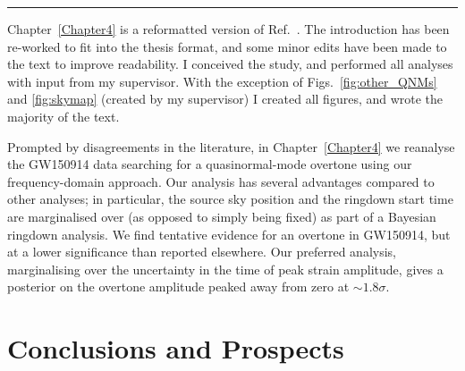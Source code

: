 \documentclass[
12pt, %
english, %
doublespacing, %
headsepline, %
]{MastersDoctoralThesis} %
\begin{document}
\begin{center}
    \rule[.5ex]{.5\textwidth}{.5pt}
\end{center}

\noindent Chapter~\ref{Chapter4} is a reformatted version of Ref.~\cite{Finch:2022ynt}. 
The introduction has been re-worked to fit into the thesis format, and some minor edits have been made to the text to improve readability. 
I conceived the study, and performed all analyses with input from my supervisor.
With the exception of Figs.~\ref{fig:other_QNMs} and \ref{fig:skymap} (created by my supervisor) I created all figures, and wrote the majority of the text.

\vspace{0.2cm}

\noindent Prompted by disagreements in the literature, in Chapter~\ref{Chapter4} we reanalyse the GW150914 data searching for a quasinormal-mode overtone using our frequency-domain approach.
Our analysis has several advantages compared to other analyses; in particular, the source sky position and the ringdown start time are marginalised over (as opposed to simply being fixed) as part of a Bayesian ringdown analysis. 
We find tentative evidence for an overtone in GW150914, but at a lower significance than reported elsewhere. 
Our preferred analysis, marginalising over the uncertainty in the time of peak strain amplitude, gives a posterior on the overtone amplitude peaked away from zero at $\sim 1.8 \sigma$.


\mainmatter %

\pagestyle{thesis} %



 

 


\chapter{Conclusions and Prospects}
\end{document}
